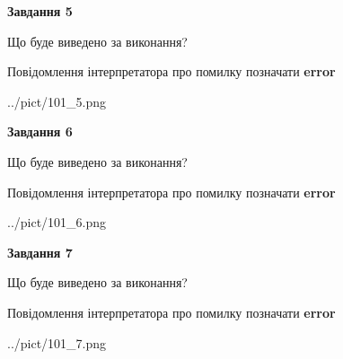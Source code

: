 \documentclass[10pt, ukrainian]{article}
\begin{document}
{\begin {large}
{\begin {center}\textbf{Завдання 5}\end {center}}\par
Що буде виведено за виконання? \par
Повідомлення інтерпретатора про помилку позначати \textbf{error}

\begin{center}
	{../pict/101_5.png}
\end{center}
\newpage

{\begin {center}\textbf{Завдання 6}\end {center}}\par
Що буде виведено за виконання? \par
Повідомлення інтерпретатора про помилку позначати \textbf{error}

\begin{center}
	{../pict/101_6.png}
\end{center}
\newpage

{\begin {center}\textbf{Завдання 7}\end {center}}\par
Що буде виведено за виконання? \par
Повідомлення інтерпретатора про помилку позначати \textbf{error}

\begin{center}
	{../pict/101_7.png}
\end{center}
\newpage

\end {large}}
\end{document}
